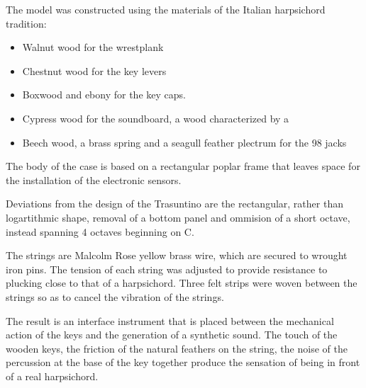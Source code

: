 The model was constructed using the materials of the Italian harpsichord
tradition:

\begin{itemize}
\item
  Walnut wood for the wrestplank
\item
  Chestnut wood for the key levers
\item
  Boxwood and ebony for the key caps.
\item
  Cypress wood for the soundboard, a wood characterized by a
\item
  Beech wood, a brass spring and a seagull feather plectrum for the 98 jacks
\end{itemize}

The body of the case is based on a rectangular poplar frame that leaves space
for the installation of the electronic sensors.

Deviations from the design of the Trasuntino are the rectangular, rather than
logartithmic shape, removal of a bottom panel and ommision of a short octave,
instead spanning 4 octaves beginning on C.

The strings are Malcolm Rose yellow brass wire, which are secured to wrought
iron pins. The tension of each string was adjusted to provide resistance to
plucking close to that of a harpsichord. Three felt strips were woven between
the strings so as to cancel the vibration of the strings.

The result is an interface instrument that is placed between the mechanical
action of the keys and the generation of a synthetic sound. The touch of the
wooden keys, the friction of the natural feathers on the string, the noise of
the percussion at the base of the key together produce the sensation of being in
front of a real harpsichord.





